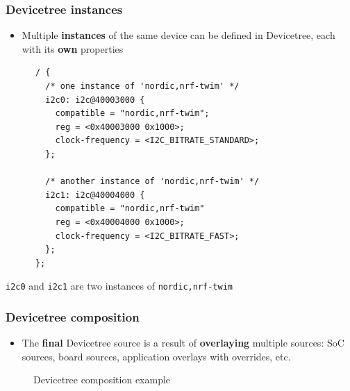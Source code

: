 \documentclass[handout]{beamer}
\begin{document}
\begin{frame}[fragile]
  \frametitle{Devicetree instances}

  \begin{itemize}
    \item Multiple \textbf{instances} of the same device can be defined in
          Devicetree, each with its \textbf{own} properties
  \end{itemize}

  \begin{listing}[H]
    \begin{verbatim}
      / {
        /* one instance of 'nordic,nrf-twim' */
        i2c0: i2c@40003000 {
          compatible = "nordic,nrf-twim";
          reg = <0x40003000 0x1000>;
          clock-frequency = <I2C_BITRATE_STANDARD>;
        };

        /* another instance of 'nordic,nrf-twim' */
        i2c1: i2c@40004000 {
          compatible = "nordic,nrf-twim"
          reg = <0x40004000 0x1000>;
          clock-frequency = <I2C_BITRATE_FAST>;
        };
      };
    \end{verbatim}
    \caption{\texttt{i2c0} and \texttt{i2c1} are two instances of
      \texttt{nordic,nrf-twim}}
  \end{listing}
\end{frame}

\begin{frame}
  \frametitle{Devicetree composition}

  \begin{itemize}
    \item The \textbf{final} Devicetree source is a result of
          \textbf{overlaying} multiple sources: SoC sources, board sources,
          application overlays with overrides, etc.
  \end{itemize}

  \begin{figure}
    \centering
    \caption{Devicetree composition example}
  \end{figure}
\end{frame}
\end{document}
